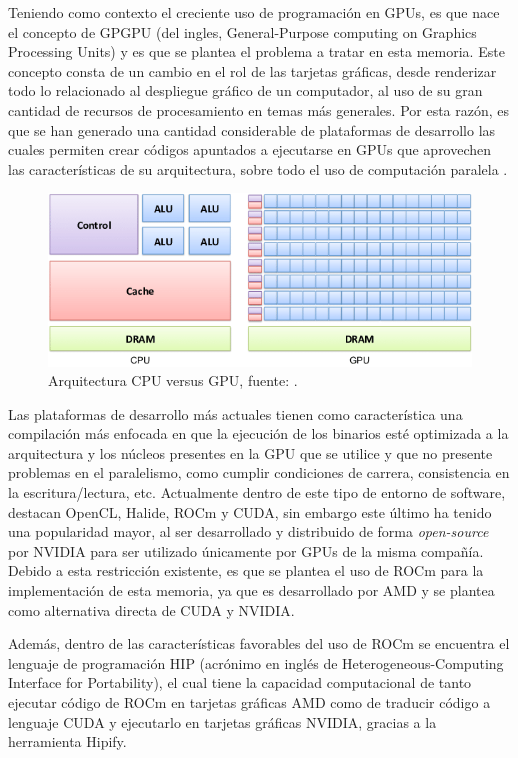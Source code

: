 
Teniendo como contexto el creciente uso de programación en GPUs, es que nace el concepto de GPGPU (del ingles, General-Purpose computing on Graphics Processing Units) y es que se plantea el problema a tratar en esta memoria.
Este concepto consta de un cambio en el rol de las tarjetas gráficas, desde renderizar todo lo relacionado al despliegue gráfico de un computador, al uso de su gran cantidad de recursos de procesamiento en temas más generales.
Por esta razón, es que se han generado una cantidad considerable de plataformas de desarrollo las cuales permiten crear códigos apuntados a ejecutarse en GPUs que aprovechen las características de su arquitectura, sobre todo el uso de computación paralela \cite{gpuev}.

\begin{figure}[h]
    \centering
    \includegraphics[scale=0.7]{Figures/arch.png}
    \caption{Arquitectura CPU versus GPU, fuente: \cite{arch}.}
    \label{fig:1}
\end{figure}

Las plataformas de desarrollo más actuales tienen como característica una compilación más enfocada en que la ejecución de los binarios esté optimizada a la arquitectura y los núcleos presentes en la GPU que se utilice y que no presente problemas en el paralelismo, como cumplir condiciones de carrera, consistencia en la escritura/lectura, etc.
Actualmente dentro de este tipo de entorno de software, destacan OpenCL, Halide, ROCm y CUDA, sin embargo este último ha tenido una popularidad mayor, al ser desarrollado y distribuido de forma \textit{open-source} por NVIDIA para ser utilizado únicamente por GPUs de la misma compañía.
Debido a esta restricción existente, es que se plantea el uso de ROCm \cite{rocm} para la implementación de esta memoria, ya que es desarrollado por AMD y se plantea como alternativa directa de CUDA y NVIDIA.

Además, dentro de las características favorables del uso de ROCm se encuentra el lenguaje de programación HIP (acrónimo en inglés de Heterogeneous-Computing Interface for Portability), el cual tiene la capacidad computacional de tanto ejecutar código de ROCm en tarjetas gráficas AMD como de traducir código a lenguaje CUDA y ejecutarlo en tarjetas gráficas NVIDIA, gracias a la herramienta Hipify.

